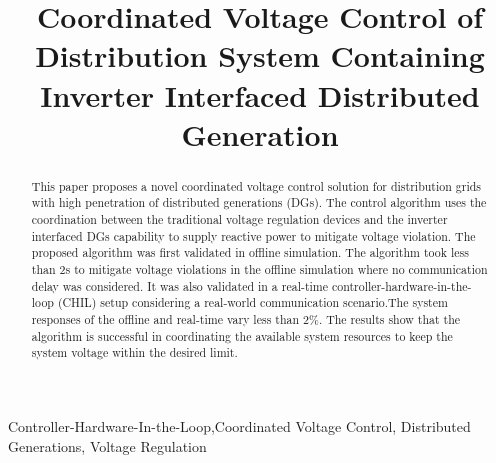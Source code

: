 \documentclass[Journal]{IEEEtran}
\begin{document}
\title{Coordinated Voltage Control of Distribution System Containing Inverter Interfaced Distributed Generation}

\author{
}





\maketitle

\begin{abstract}
    This paper proposes a novel coordinated voltage control solution for distribution grids with high penetration of distributed generations (DGs). The control algorithm uses the coordination between the traditional voltage regulation devices and the inverter interfaced DGs capability to supply reactive power to mitigate voltage violation. The proposed algorithm was first validated in offline simulation. The algorithm took less than 2s to mitigate voltage violations in the offline simulation where no communication delay was considered. It was also validated in a real-time controller-hardware-in-the-loop (CHIL) setup considering a real-world communication scenario.The system responses of the offline and real-time vary less than 2\%. The results show that the algorithm is successful in coordinating the available system resources to keep the system voltage within the desired limit.
\end{abstract}


\begin{IEEEkeywords}
Controller-Hardware-In-the-Loop,Coordinated Voltage Control, Distributed Generations, Voltage Regulation
\end{IEEEkeywords}
\end{document}

